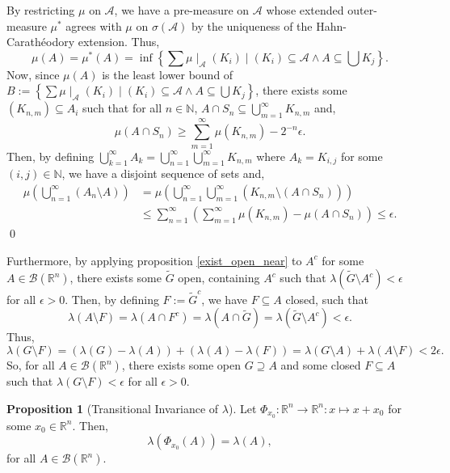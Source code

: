 \documentclass[
]{article}
\theoremstyle{definition}
\newtheorem{prop}{Proposition}
\theoremstyle{definition}
\begin{document}
By restricting \(\mu\) on \(\mathcal{A}\), we have a pre-measure on
\(\mathcal{A}\) whose extended outer-measure \(\mu^*\) agrees with
\(\mu\) on \(\sigma(\mathcal{A})\) by the uniqueness of the
Hahn-Carathéodory extension. Thus,
\[\mu(A) = \mu^*(A) = \inf \left\{ \sum \mu\mid_\mathcal{A}(K_i) \mid (K_i) \subseteq \mathcal{A} 
  \wedge A \subseteq \bigcup K_j\right\}.\] Now, since \(\mu(A)\) is the
least lower bound of
\(B :=  \left\{ \sum \mu\mid_\mathcal{A}(K_i) \mid (K_i) \subseteq \mathcal{A}  \wedge A \subseteq \bigcup K_j\right\}\),
there exists some \((K_{n, m}) \subseteq A_i\) such that for all
\(n \in \mathbb{N}\),
\(A \cap S_n \subseteq \bigcup_{m = 1}^\infty K_{n, m}\) and,
\[\mu(A \cap S_n) \ge \sum_{m = 1}^\infty \mu(K_{n, m}) - 2^{-n}\epsilon.\]
Then, by defining
\(\bigcup_{k = 1}^\infty A_k = \bigcup_{n = 1}^\infty  \bigcup_{m = 1}^\infty K_{n ,m}\)
where \(A_k = K_{i, j}\) for some \((i, j) \in \mathbb{N}\), we have a
disjoint sequence of sets and, \[\begin{split}
    \mu\left(\bigcup_{n = 1}^\infty (A_n \setminus A)\right)
    & = \mu\left(\bigcup_{n = 1}^\infty 
      \bigcup_{m = 1}^\infty (K_{n, m} \setminus (A \cap S_n))\right)\\
    & \le \sum_{n = 1}^\infty \left(\sum_{m = 1}^\infty \mu(K_{n, m}) - \mu(A \cap S_n)\right) 
    \le \epsilon.
  \end{split}\] \qed

Furthermore, by applying proposition \ref{exist_open_near} to \(A^c\)
for some \(A \in \mathcal{B}(\mathbb{R}^n)\), there exists some
\(\tilde G\) open, containing \(A^c\) such that
\(\lambda(\tilde G \setminus A^c) < \epsilon\) for all \(\epsilon > 0\).
Then, by defining \(F := \tilde G^c\), we have \(F \subseteq A\) closed,
such that
\[\lambda(A \setminus F) = \lambda(A \cap F^c) = \lambda (A \cap \tilde G) 
  = \lambda(\tilde G \setminus A^c) < \epsilon.\] Thus,
\[\lambda(G \setminus F) = 
  (\lambda(G) - \lambda(A)) + (\lambda(A) - \lambda(F)) 
  = \lambda(G \setminus A) + \lambda(A \setminus F) < 2 \epsilon.\] So,
for all \(A \in \mathcal{B}(\mathbb{R}^n)\), there exists some open
\(G \supseteq A\) and some closed \(F \subseteq A\) such that
\(\lambda(G \setminus F) < \epsilon\) for all \(\epsilon > 0\).

\begin{prop}[Transitional Invariance of \(\lambda\)]
  Let \(\Phi_{x_0} : \mathbb{R}^n \to \mathbb{R}^n : x \mapsto x + x_0\) for 
  some \(x_0 \in \mathbb{R}^n\). Then, 
  \[\lambda(\Phi_{x_0}(A)) = \lambda(A),\]
  for all \(A \in \mathcal{B}(\mathbb{R}^n)\).
\end{prop}
\proof
\end{document}
